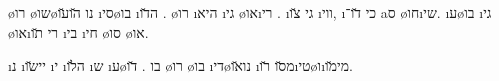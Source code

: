 \o{רו} \o{שו}\o{נו} \u{הו}\u{עו}  \i{סי}\o{בו} \i{ה}\u{דו}  \dinozaurim. \o{רו}  \i{היא} \i{גי} \o{או}\i{רי} . \i{גי}     \u{צו} \i{ווי},  \i{כי}  \u{דו}־ a{ס}     \o{חו}\i{שי}. \i{ע}\o{בו} \i{גי} \o{או}\i{רי} \u{תו} \i{בי} \i{חי}  \o{סו} \o{או}.

 \i{נ} \i{יי}\u{שו}  \i{י} \i{ה}\u{לו} \i{ש}  \i{ע}\o{בו} \dinozaurim. \u{דו} \o{רו}  \o{בו}  \i{די}\o{נו}\u{או} \i{מ}\u{סו} \u{רו}\i{טי}\o{ו}\i{מי}\u{מו}.


